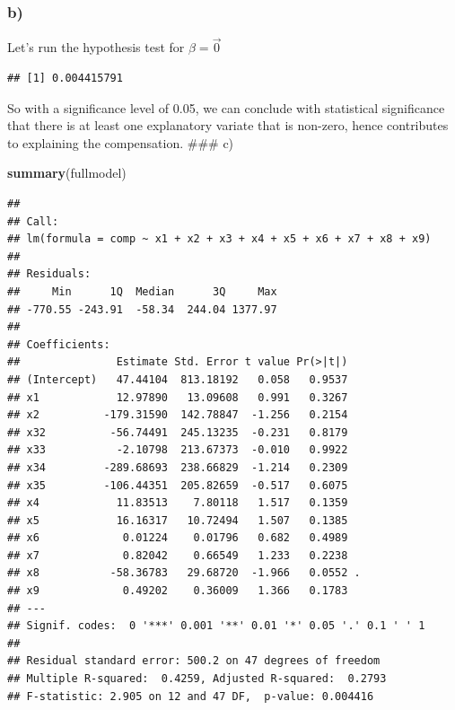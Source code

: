 \documentclass[
]{article}
\newenvironment{Shaded}{\begin{snugshade}}{\end{snugshade}}
\newcommand{\DecValTok}[1]{\textcolor[rgb]{0.00,0.00,0.81}{#1}}
\newcommand{\FunctionTok}[1]{\textcolor[rgb]{0.13,0.29,0.53}{\textbf{#1}}}
\newcommand{\NormalTok}[1]{#1}
\newcommand{\OtherTok}[1]{\textcolor[rgb]{0.56,0.35,0.01}{#1}}
\newcommand{\SpecialCharTok}[1]{\textcolor[rgb]{0.81,0.36,0.00}{\textbf{#1}}}
\begin{document}
\subsubsection{b)}\label{b-1}

Let's run the hypothesis test for \(\hat \beta = \vec 0\)

\begin{Shaded}
\end{Shaded}

\begin{verbatim}
## [1] 0.004415791
\end{verbatim}

So with a significance level of 0.05, we can conclude with statistical
significance that there is at least one explanatory variate that is
non-zero, hence contributes to explaining the compensation. \#\#\# c)

\begin{Shaded}
\begin{Highlighting}[]
\FunctionTok{summary}\NormalTok{(fullmodel)}
\end{Highlighting}
\end{Shaded}

\begin{verbatim}
## 
## Call:
## lm(formula = comp ~ x1 + x2 + x3 + x4 + x5 + x6 + x7 + x8 + x9)
## 
## Residuals:
##     Min      1Q  Median      3Q     Max 
## -770.55 -243.91  -58.34  244.04 1377.97 
## 
## Coefficients:
##               Estimate Std. Error t value Pr(>|t|)  
## (Intercept)   47.44104  813.18192   0.058   0.9537  
## x1            12.97890   13.09608   0.991   0.3267  
## x2          -179.31590  142.78847  -1.256   0.2154  
## x32          -56.74491  245.13235  -0.231   0.8179  
## x33           -2.10798  213.67373  -0.010   0.9922  
## x34         -289.68693  238.66829  -1.214   0.2309  
## x35         -106.44351  205.82659  -0.517   0.6075  
## x4            11.83513    7.80118   1.517   0.1359  
## x5            16.16317   10.72494   1.507   0.1385  
## x6             0.01224    0.01796   0.682   0.4989  
## x7             0.82042    0.66549   1.233   0.2238  
## x8           -58.36783   29.68720  -1.966   0.0552 .
## x9             0.49202    0.36009   1.366   0.1783  
## ---
## Signif. codes:  0 '***' 0.001 '**' 0.01 '*' 0.05 '.' 0.1 ' ' 1
## 
## Residual standard error: 500.2 on 47 degrees of freedom
## Multiple R-squared:  0.4259, Adjusted R-squared:  0.2793 
## F-statistic: 2.905 on 12 and 47 DF,  p-value: 0.004416
\end{verbatim}
\end{document}
